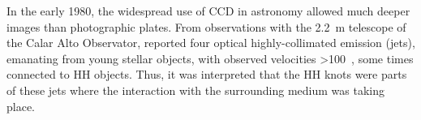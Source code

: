 \documentclass[12pt]{mythesis}
\begin{document}



In the early 1980, the widespread use of CCD in astronomy allowed much deeper images than photographic plates. From observations with the 2.2~m telescope of the Calar Alto Observator, \citet{mundt1983} reported four optical highly-collimated emission (jets), emanating from young stellar objects, with observed velocities >100~\kms, some times connected to HH objects. Thus, it was interpreted that the HH knots were parts of these 
jets where the interaction with the surrounding medium was taking place.





% 
% 

\end{document}
